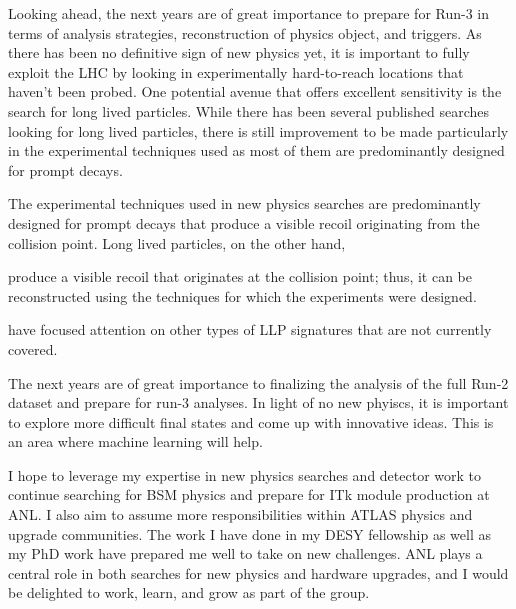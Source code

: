 \documentclass[a4paper]{article}
\begin{document}
Looking ahead, the next years are of great importance to prepare for Run-3 in terms of analysis strategies, reconstruction of physics object, and triggers. As there has been no definitive sign of new physics yet,
it is important to fully exploit the LHC by looking in experimentally hard-to-reach locations that haven't been probed.
One potential avenue that offers excellent sensitivity is the search for long lived particles.
While there has been several published searches looking for long lived particles, there is still improvement to be made
particularly in the experimental techniques used as most of them are  predominantly designed for prompt decays.



The experimental techniques used in new physics searches are predominantly designed for prompt decays that produce a visible recoil
originating from the collision point. Long lived particles, on the other hand,


produce a visible recoil that originates at the collision point; thus, it can be reconstructed using the techniques for which the experiments were designed.


have focused attention on other types of LLP signatures that are not currently covered.


The next years are of great importance to finalizing the analysis of the full Run-2 dataset and prepare for run-3 analyses. In light of no new phyiscs, it is important to explore more difficult final states and come up with innovative ideas. This is an area where machine learning will help.



I hope to leverage my expertise in new physics searches and detector work to continue searching for BSM physics and prepare for ITk
module production at ANL. I also aim to assume more responsibilities within ATLAS physics and upgrade communities. The work I have done
in my DESY fellowship as well as my PhD work have prepared me well to take on new challenges.
ANL plays a central role in both searches for new physics and hardware upgrades, and I would be delighted to work,
learn, and grow as part of the group.



%
\end{document}
